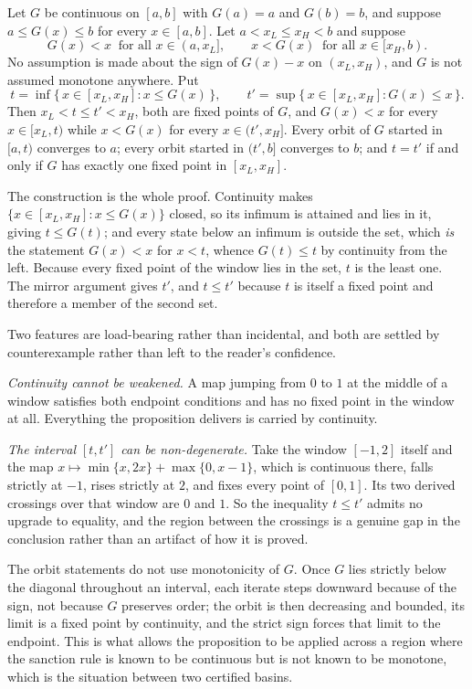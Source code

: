 \begin{proposition}
\label{prop:derived-crossings}
Let $G$ be continuous on $[a,b]$ with $G(a)=a$ and $G(b)=b$, and suppose
$a\le G(x)\le b$ for every $x\in[a,b]$. Let $a<x_L\le x_H<b$ and suppose
\[
  G(x)<x\ \text{ for all }x\in(a,x_L],
  \qquad
  x<G(x)\ \text{ for all }x\in[x_H,b).
\]
No assumption is made about the sign of $G(x)-x$ on $(x_L,x_H)$, and $G$ is not
assumed monotone anywhere. Put
\[
  t=\inf\{\,x\in[x_L,x_H]:x\le G(x)\,\},
  \qquad
  t'=\sup\{\,x\in[x_L,x_H]:G(x)\le x\,\}.
\]
Then $x_L<t\le t'<x_H$, both are fixed points of $G$, and $G(x)<x$ for every
$x\in[x_L,t)$ while $x<G(x)$ for every $x\in(t',x_H]$. Every orbit of $G$ started
in $[a,t)$ converges to $a$; every orbit started in $(t',b]$ converges to $b$;
and $t=t'$ if and only if $G$ has exactly one fixed point in $[x_L,x_H]$.
\end{proposition}

The construction is the whole proof. Continuity makes
$\{x\in[x_L,x_H]:x\le G(x)\}$ closed, so its infimum is attained and lies in it,
giving $t\le G(t)$; and every state below an infimum is outside the set, which
\emph{is} the statement $G(x)<x$ for $x<t$, whence $G(t)\le t$ by continuity from
the left. Because every fixed point of the window lies in the set, $t$ is the
least one. The mirror argument gives $t'$, and $t\le t'$ because $t$ is itself a
fixed point and therefore a member of the second set.

Two features are load-bearing rather than incidental, and both are settled by
counterexample rather than left to the reader's confidence.

\emph{Continuity cannot be weakened.} A map jumping from $0$ to $1$ at the middle
of a window satisfies both endpoint conditions and has no fixed point in the
window at all. Everything the proposition delivers is carried by continuity.

\emph{The interval $[t,t']$ can be non-degenerate.} Take the window $[-1,2]$
itself and the map $x\mapsto\min\{x,2x\}+\max\{0,x-1\}$, which is continuous
there, falls strictly at $-1$, rises strictly at $2$, and fixes every point of
$[0,1]$. Its two derived crossings over that window are $0$ and $1$. So the
inequality $t\le t'$ admits no upgrade to equality, and the region between the
crossings is a genuine gap in the conclusion rather than an artifact of how it is
proved.

The orbit statements do not use monotonicity of $G$. Once $G$ lies strictly below
the diagonal throughout an interval, each iterate steps downward because of the
sign, not because $G$ preserves order; the orbit is then decreasing and bounded,
its limit is a fixed point by continuity, and the strict sign forces that limit to
the endpoint. This is what allows the proposition to be applied across a region
where the sanction rule is known to be continuous but is not known to be monotone,
which is the situation between two certified basins.


